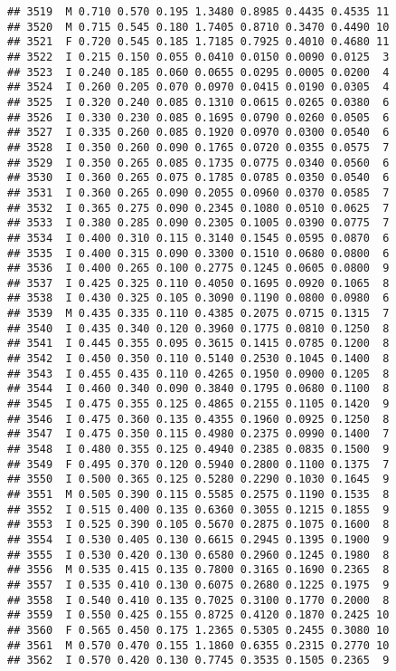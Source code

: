 \documentclass[
]{article}
\begin{document}
\begin{verbatim}
## 3519  M 0.710 0.570 0.195 1.3480 0.8985 0.4435 0.4535 11
## 3520  M 0.715 0.545 0.180 1.7405 0.8710 0.3470 0.4490 10
## 3521  F 0.720 0.545 0.185 1.7185 0.7925 0.4010 0.4680 11
## 3522  I 0.215 0.150 0.055 0.0410 0.0150 0.0090 0.0125  3
## 3523  I 0.240 0.185 0.060 0.0655 0.0295 0.0005 0.0200  4
## 3524  I 0.260 0.205 0.070 0.0970 0.0415 0.0190 0.0305  4
## 3525  I 0.320 0.240 0.085 0.1310 0.0615 0.0265 0.0380  6
## 3526  I 0.330 0.230 0.085 0.1695 0.0790 0.0260 0.0505  6
## 3527  I 0.335 0.260 0.085 0.1920 0.0970 0.0300 0.0540  6
## 3528  I 0.350 0.260 0.090 0.1765 0.0720 0.0355 0.0575  7
## 3529  I 0.350 0.265 0.085 0.1735 0.0775 0.0340 0.0560  6
## 3530  I 0.360 0.265 0.075 0.1785 0.0785 0.0350 0.0540  6
## 3531  I 0.360 0.265 0.090 0.2055 0.0960 0.0370 0.0585  7
## 3532  I 0.365 0.275 0.090 0.2345 0.1080 0.0510 0.0625  7
## 3533  I 0.380 0.285 0.090 0.2305 0.1005 0.0390 0.0775  7
## 3534  I 0.400 0.310 0.115 0.3140 0.1545 0.0595 0.0870  6
## 3535  I 0.400 0.315 0.090 0.3300 0.1510 0.0680 0.0800  6
## 3536  I 0.400 0.265 0.100 0.2775 0.1245 0.0605 0.0800  9
## 3537  I 0.425 0.325 0.110 0.4050 0.1695 0.0920 0.1065  8
## 3538  I 0.430 0.325 0.105 0.3090 0.1190 0.0800 0.0980  6
## 3539  M 0.435 0.335 0.110 0.4385 0.2075 0.0715 0.1315  7
## 3540  I 0.435 0.340 0.120 0.3960 0.1775 0.0810 0.1250  8
## 3541  I 0.445 0.355 0.095 0.3615 0.1415 0.0785 0.1200  8
## 3542  I 0.450 0.350 0.110 0.5140 0.2530 0.1045 0.1400  8
## 3543  I 0.455 0.435 0.110 0.4265 0.1950 0.0900 0.1205  8
## 3544  I 0.460 0.340 0.090 0.3840 0.1795 0.0680 0.1100  8
## 3545  I 0.475 0.355 0.125 0.4865 0.2155 0.1105 0.1420  9
## 3546  I 0.475 0.360 0.135 0.4355 0.1960 0.0925 0.1250  8
## 3547  I 0.475 0.350 0.115 0.4980 0.2375 0.0990 0.1400  7
## 3548  I 0.480 0.355 0.125 0.4940 0.2385 0.0835 0.1500  9
## 3549  F 0.495 0.370 0.120 0.5940 0.2800 0.1100 0.1375  7
## 3550  I 0.500 0.365 0.125 0.5280 0.2290 0.1030 0.1645  9
## 3551  M 0.505 0.390 0.115 0.5585 0.2575 0.1190 0.1535  8
## 3552  I 0.515 0.400 0.135 0.6360 0.3055 0.1215 0.1855  9
## 3553  I 0.525 0.390 0.105 0.5670 0.2875 0.1075 0.1600  8
## 3554  I 0.530 0.405 0.130 0.6615 0.2945 0.1395 0.1900  9
## 3555  I 0.530 0.420 0.130 0.6580 0.2960 0.1245 0.1980  8
## 3556  M 0.535 0.415 0.135 0.7800 0.3165 0.1690 0.2365  8
## 3557  I 0.535 0.410 0.130 0.6075 0.2680 0.1225 0.1975  9
## 3558  I 0.540 0.410 0.135 0.7025 0.3100 0.1770 0.2000  8
## 3559  I 0.550 0.425 0.155 0.8725 0.4120 0.1870 0.2425 10
## 3560  F 0.565 0.450 0.175 1.2365 0.5305 0.2455 0.3080 10
## 3561  M 0.570 0.470 0.155 1.1860 0.6355 0.2315 0.2770 10
## 3562  I 0.570 0.420 0.130 0.7745 0.3535 0.1505 0.2365  9

\end{verbatim}
\end{document}
